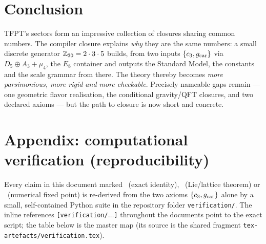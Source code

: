 \section*{Conclusion}
TFPT's sectors form an impressive collection of closures sharing common numbers. The compiler
closure explains \emph{why} they are the same numbers: a small discrete generator $\mathbb{Z}_{30}=2\cdot3\cdot5$
builds, from two inputs $\{c_3,g_{\mathrm{car}}\}$ via $D_5\oplus A_3+\mu_4$, the $E_8$ container and outputs
the Standard Model, the constants and the scale grammar from there. The theory thereby becomes
\emph{more parsimonious, more rigid and more checkable}. Precisely nameable gaps remain --- one
geometric flavor realisation, the conditional gravity/QFT closures, and two declared axioms --- but the
path to closure is now short and concrete.



\section*{Appendix: computational verification (reproducibility)}
Every claim in this document marked \mE\ (exact identity), \mE\ (Lie/lattice theorem) or \mE\ (numerical
fixed point) is re-derived from the two axioms $\{c_3,g_{\mathrm{car}}\}$ alone by a small, self-contained Python
suite in the repository folder \texttt{verification/}. The inline references \texttt{[verification/$\dots$]}
throughout the documents point to the exact script; the table below is the master map (its source is
the shared fragment \texttt{tex-artefacts/verification.tex}).

